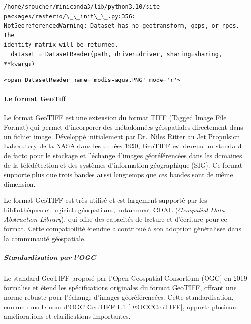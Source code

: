 \documentclass[11pt]{article}
\makeatletter
\newcommand{\boxspacing}{\kern\kvtcb@left@rule\kern\kvtcb@boxsep}
\newcommand{\prompt}[4]{
        {\ttfamily\llap{{\color{#2}[#3]:\hspace{3pt}#4}}\vspace{-\baselineskip}}
    }
\makeatother
\begin{document}
    \begin{Verbatim}[commandchars=\\\{\}]
/home/sfoucher/miniconda3/lib/python3.10/site-packages/rasterio/\_\_init\_\_.py:356:
NotGeoreferencedWarning: Dataset has no geotransform, gcps, or rpcs. The
identity matrix will be returned.
  dataset = DatasetReader(path, driver=driver, sharing=sharing, **kwargs)
    \end{Verbatim}

            \begin{tcolorbox}[breakable, size=fbox, boxrule=.5pt, pad at break*=1mm, opacityfill=0]
\prompt{Out}{outcolor}{7}{\boxspacing}
\begin{Verbatim}[commandchars=\\\{\}]
<open DatasetReader name='modis-aqua.PNG' mode='r'>
\end{Verbatim}
\end{tcolorbox}
        
    \hypertarget{le-format-geotiff}{%
\paragraph{Le format GeoTiff}\label{le-format-geotiff}}

Le format GeoTIFF est une extension du format TIFF (Tagged Image File
Format) qui permet d'incorporer des métadonnées géospatiales directement
dans un fichier image. Développé initialement par Dr.~Niles Ritter au
Jet Propulsion Laboratory de la
\href{https://www.earthdata.nasa.gov/esdis/esco/standards-and-practices/geotiff}{NASA}
dans les années 1990, GeoTIFF est devenu un standard de facto pour le
stockage et l'échange d'images géoréférencées dans les domaines de la
télédétection et des systèmes d'information géographique (SIG). Ce
format supporte plus que trois bandes aussi longtemps que ces bandes
sont de même dimension.

Le format GeoTIFF est très utilisé et est largement supporté par les
bibliothèques et logiciels géospatiaux, notamment
\href{https://gdal.org}{GDAL} (\emph{Geospatial Data Abstraction
Library}), qui offre des capacités de lecture et d'écriture pour ce
format. Cette compatibilité étendue a contribué à son adoption
généralisée dans la communauté géospatiale.

\hypertarget{standardisation-par-logc}{%
\subparagraph{Standardisation par
l'OGC}\label{standardisation-par-logc}}

Le standard GeoTIFF proposé par l'Open Geospatial Consortium (OGC) en
2019 formalise et étend les spécifications originales du format GeoTIFF,
offrant une norme robuste pour l'échange d'images géoréférencées. Cette
standardisation, connue sous le nom d'OGC GeoTIFF 1.1
{[}-@OGCGeoTIFF{]}, apporte plusieurs améliorations et clarifications
importantes.
\end{document}
